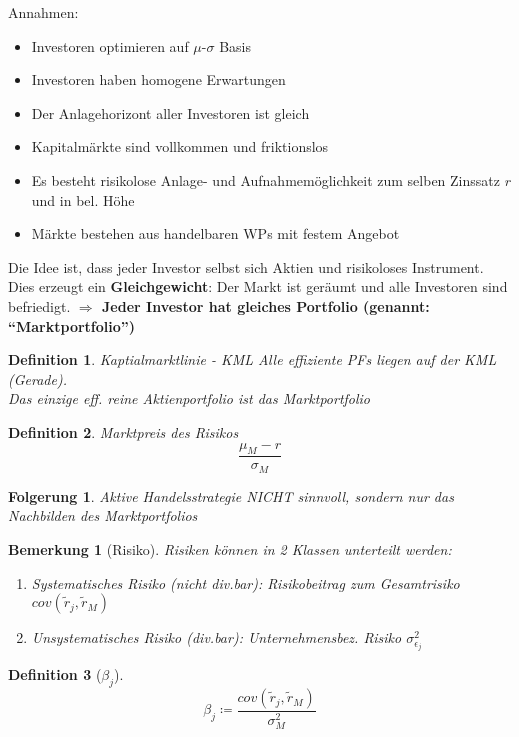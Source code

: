 \documentclass[a4paper]{article}
\theoremstyle{break}
\newtheorem{defi}{Definition}[section]
\newtheorem{ann}{Bemerkung}[section]
\newtheorem{der}{Folgerung}[section]
\begin{document}
Annahmen:
\begin{itemize}
    \item Investoren optimieren auf $\mu$-$\sigma$ Basis
    \item Investoren haben homogene Erwartungen
    \item Der Anlagehorizont aller Investoren ist gleich
    \item Kapitalmärkte sind vollkommen und friktionslos
    \item Es besteht risikolose Anlage- und Aufnahmemöglichkeit zum selben Zinssatz $r$ und in bel. Höhe
    \item Märkte bestehen aus handelbaren WPs mit festem Angebot
\end{itemize}

Die Idee ist, dass jeder Investor selbst sich Aktien und risikoloses Instrument. Dies erzeugt ein \textbf{Gleichgewicht}: Der Markt ist geräumt und alle Investoren sind befriedigt. \textbf{$\Longrightarrow$ Jeder Investor hat gleiches Portfolio (genannt: ``Marktportfolio'')}

\begin{defi}{Kaptialmarktlinie - KML}
    Alle effiziente PFs liegen auf der KML (Gerade).\\
    Das einzige eff. reine Aktienportfolio ist das Marktportfolio
\end{defi}

\begin{defi}{Marktpreis des Risikos}
    $$\frac{\mu_M - r}{\sigma_M}$$
\end{defi}

\begin{der}
    Aktive Handelsstrategie NICHT sinnvoll, sondern nur das Nachbilden des Marktportfolios    
\end{der}

\begin{ann}[Risiko]
    Risiken können in 2 Klassen unterteilt werden:\\
   \begin{enumerate}
       \item Systematisches Risiko (nicht div.bar): Risikobeitrag zum Gesamtrisiko $cov(\tilde{r}_j, \tilde{r}_M)$
       \item Unsystematisches Risiko (div.bar): Unternehmensbez. Risiko $\sigma^{2}_{\epsilon_j}$
   \end{enumerate}    
\end{ann}

\begin{defi}[$\beta_j$]
    $$\beta_j \coloneqq \frac{cov(\tilde{r}_j, \tilde{r}_M)}{\sigma^{2}_M}$$
\end{defi}
\end{document}

